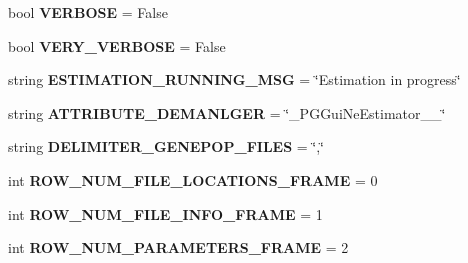 \begin{DoxyCompactItemize}
\item 
bool {\bfseries V\+E\+R\+B\+O\+SE} = False\hypertarget{namespacenegui_1_1temp_aa6704c3e0352bd9c433e7ce30f7d2119}{}\label{namespacenegui_1_1temp_aa6704c3e0352bd9c433e7ce30f7d2119}

\item 
bool {\bfseries V\+E\+R\+Y\+\_\+\+V\+E\+R\+B\+O\+SE} = False\hypertarget{namespacenegui_1_1temp_a81e472b78c1081c877f5cd3050f0e457}{}\label{namespacenegui_1_1temp_a81e472b78c1081c877f5cd3050f0e457}

\item 
string {\bfseries E\+S\+T\+I\+M\+A\+T\+I\+O\+N\+\_\+\+R\+U\+N\+N\+I\+N\+G\+\_\+\+M\+SG} = \char`\"{}Estimation in progress\char`\"{}\hypertarget{namespacenegui_1_1temp_a6582125803caac221f721adc5249ae47}{}\label{namespacenegui_1_1temp_a6582125803caac221f721adc5249ae47}

\item 
string {\bfseries A\+T\+T\+R\+I\+B\+U\+T\+E\+\_\+\+D\+E\+M\+A\+N\+L\+G\+ER} = \char`\"{}\+\_\+\+P\+G\+Gui\+Ne\+Estimator\+\_\+\+\_\+\char`\"{}\hypertarget{namespacenegui_1_1temp_ac4600c7cc80eb95789cb294ff2890ca5}{}\label{namespacenegui_1_1temp_ac4600c7cc80eb95789cb294ff2890ca5}

\item 
string {\bfseries D\+E\+L\+I\+M\+I\+T\+E\+R\+\_\+\+G\+E\+N\+E\+P\+O\+P\+\_\+\+F\+I\+L\+ES} = \char`\"{},\char`\"{}\hypertarget{namespacenegui_1_1temp_aed586ad96045e04a3e9a93d1e4318fd1}{}\label{namespacenegui_1_1temp_aed586ad96045e04a3e9a93d1e4318fd1}

\item 
int {\bfseries R\+O\+W\+\_\+\+N\+U\+M\+\_\+\+F\+I\+L\+E\+\_\+\+L\+O\+C\+A\+T\+I\+O\+N\+S\+\_\+\+F\+R\+A\+ME} = 0\hypertarget{namespacenegui_1_1temp_a248158ff020a4d0193db35a5acc01847}{}\label{namespacenegui_1_1temp_a248158ff020a4d0193db35a5acc01847}

\item 
int {\bfseries R\+O\+W\+\_\+\+N\+U\+M\+\_\+\+F\+I\+L\+E\+\_\+\+I\+N\+F\+O\+\_\+\+F\+R\+A\+ME} = 1\hypertarget{namespacenegui_1_1temp_ae4b9e632022bb8cca875f202efdf1b3b}{}\label{namespacenegui_1_1temp_ae4b9e632022bb8cca875f202efdf1b3b}

\item 
int {\bfseries R\+O\+W\+\_\+\+N\+U\+M\+\_\+\+P\+A\+R\+A\+M\+E\+T\+E\+R\+S\+\_\+\+F\+R\+A\+ME} = 2\hypertarget{namespacenegui_1_1temp_a5952a85ab717b5091b0274e3c5264b08}{}\label{namespacenegui_1_1temp_a5952a85ab717b5091b0274e3c5264b08}


\end{DoxyCompactItemize}
